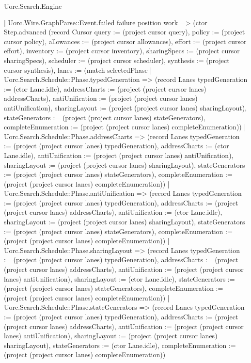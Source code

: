 \begin{lexlean}{Uorc.Search.Engine}
\begin{semanticmodule}
{      | Uorc.Wire.GraphParse::Event.failed failure position work => (ctor Step.advanced (record Cursor {query := (project cursor query), policy := (project cursor policy), allowances := (project cursor allowances), effort := (project cursor effort), inventory := (project cursor inventory), sharingSpecs := (project cursor sharingSpecs), scheduler := (project cursor scheduler), synthesis := (project cursor synthesis), lanes := (match selectedPhase
        | Uorc.Search.Schedule::Phase.typedGeneration => (record Lanes {typedGeneration := (ctor Lane.idle), addressCharts := (project (project cursor lanes) addressCharts), antiUnification := (project (project cursor lanes) antiUnification), sharingLayout := (project (project cursor lanes) sharingLayout), stateGenerators := (project (project cursor lanes) stateGenerators), completeEnumeration := (project (project cursor lanes) completeEnumeration)})
        | Uorc.Search.Schedule::Phase.addressCharts => (record Lanes {typedGeneration := (project (project cursor lanes) typedGeneration), addressCharts := (ctor Lane.idle), antiUnification := (project (project cursor lanes) antiUnification), sharingLayout := (project (project cursor lanes) sharingLayout), stateGenerators := (project (project cursor lanes) stateGenerators), completeEnumeration := (project (project cursor lanes) completeEnumeration)})
        | Uorc.Search.Schedule::Phase.antiUnification => (record Lanes {typedGeneration := (project (project cursor lanes) typedGeneration), addressCharts := (project (project cursor lanes) addressCharts), antiUnification := (ctor Lane.idle), sharingLayout := (project (project cursor lanes) sharingLayout), stateGenerators := (project (project cursor lanes) stateGenerators), completeEnumeration := (project (project cursor lanes) completeEnumeration)})
        | Uorc.Search.Schedule::Phase.sharingLayout => (record Lanes {typedGeneration := (project (project cursor lanes) typedGeneration), addressCharts := (project (project cursor lanes) addressCharts), antiUnification := (project (project cursor lanes) antiUnification), sharingLayout := (ctor Lane.idle), stateGenerators := (project (project cursor lanes) stateGenerators), completeEnumeration := (project (project cursor lanes) completeEnumeration)})
        | Uorc.Search.Schedule::Phase.stateGenerators => (record Lanes {typedGeneration := (project (project cursor lanes) typedGeneration), addressCharts := (project (project cursor lanes) addressCharts), antiUnification := (project (project cursor lanes) antiUnification), sharingLayout := (project (project cursor lanes) sharingLayout), stateGenerators := (ctor Lane.idle), completeEnumeration := (project (project cursor lanes) completeEnumeration)})
}}
\end{semanticmodule}
\end{lexlean}
